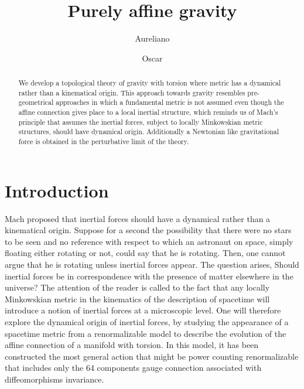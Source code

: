 \documentclass[twocolumn,
  showpacs,showkeys,prd,superscriptaddress]{revtex4-1}
\begin{document}
\title{Purely affine gravity}


\author{Aureliano }

\author{Oscar }

\begin{abstract}
  We develop a topological theory of gravity with torsion where metric has a dynamical rather than a kinematical origin. This approach towards gravity resembles pre-geometrical approaches in which a fundamental metric is not assumed even though the  affine connection gives place to a local inertial structure, which reminds us of Mach's principle that assumes the inertial forces, subject to locally Minkowskian metric structures, should have dynamical origin. Additionally a Newtonian like gravitational force is obtained in the perturbative limit of the theory.
\end{abstract}


\maketitle

\section{Introduction}


Mach proposed that inertial forces should have a dynamical rather than a kinematical origin. Suppose for a second the possibility that there were no stars to be seen and no reference with respect to which an astronaut on space, simply floating either rotating or not, could say that he is rotating. Then, one cannot argue that he is rotating unless inertial forces appear.  The question arises, Should inertial forces  be in correspondence with the presence of matter elsewhere in the universe?  The attention of the reader is called to the fact that any locally Minkowskian metric in the kinematics of the description of spacetime will introduce a notion of inertial forces at a microscopic level. One will therefore explore the dynamical origin of inertial forces, by studying the appearance of a spacetime metric from a renormalizable model to describe the evolution of the affine connection of a manifold with torsion. In this model, it has been constructed the most general action that might be power counting renormalizable that includes only the 64 components gauge connection associated with diffeomorphisms invariance.
\end{document}
